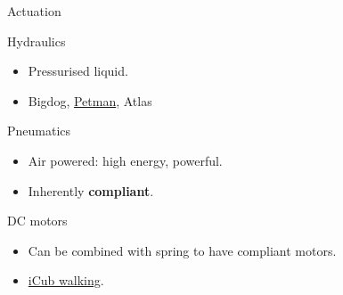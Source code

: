 \documentclass[compress]{beamer}
\begin{document}
\begin{frame}{Actuation}

    Hydraulics

    \begin{itemize}

        \item Pressurised liquid.
        \item Bigdog, \href{http://www.youtube.com/watch?v=QRbvNL1PHKg}{Petman}, Atlas
    \end{itemize}

    Pneumatics

    \begin{itemize}

        \item Air powered: high energy, powerful.
        \item Inherently \textbf{compliant}.
    \end{itemize}

    \pause

    DC motors

    \begin{itemize}

        \item Can be combined with spring to have compliant motors.
        \item \href{http://www.youtube.com/watch?v=XVYsqv3sLew}{iCub walking}.
    \end{itemize}

\end{frame}

\end{document}
